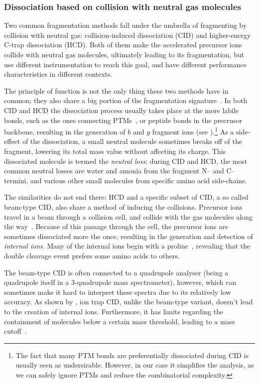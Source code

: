 \subsubsection{Dissociation based on collision with neutral gas molecules}

Two common fragmentation methods fall under the umbrella of fragmenting by collision with neutral gas: collision-induced dissociation (CID) and higher-energy C-trap dissociation (HCD). Both of them make the accelerated precursor ions collide with neutral gas molecules, ultimately leading to its fragmentation, but use different instrumentation to reach this goal, and have different performance characteristics in different contexts.

The principle of function is not the only thing these two methods have in common; they also share a big portion of the fragmentation signature~\cite{michalski2012systematic}. In both CID and HCD the dissociation process usually takes place at the more labile bonds, such as the ones connecting PTMs~\cite{quan2013cid}, or peptide bonds in the precrusor backbone, resulting in the generation of \(b\) and \(y\) fragment ions (see ).\footnote{The fact that many PTM bonds are preferentially dissociated during CID is usually seen as undersirable. However, in our case it simplifies the analysis, as we can safely ignore PTMs and reduce the combinatorial complexity.} As a side-effect of the dissociation, a small neutral molecule sometimes breaks off of the fragment, lowering its total mass value without affecting its charge. This dissociated molecule is termed the \emph{neutral loss}; during CID and HCD, the most common neutral losses are water and amonia from the fragment N-- and C-- termini, and various other small molecules from specific amino acid side-chains.

The similarities do not end there: HCD and a specific subset of CID, a so called beam-type CID, also share a method of inducing the collisions. Precursor ions travel in a beam through a collision cell, and collide with the gas molecules along the way~\cite{xia2006ion}. Because of this passage through the cell, the precursor ions are sometimes dissociated more the once, resulting in the generation and detection of \emph{internal ions}. Many of the internal ions begin with a proline~\cite{michalski2012systematic}, revealing that the double cleavage event prefers some amino acids to others.

The beam-type CID is often connected to a quadrupole analyser (being a quadrupole itself in a 3-quadrupole mass spectrometer), however, which can sometimes make it hard to interpret these spectra due to its relatively low accuracy. As shown by \citet{michalski2012systematic}, ion trap CID, unlike the beam-type variant, doesn't lead to the creation of internal ions. Furthermore, it has limits regarding the containment of molecules below a certain mass threshold, leading to a mass cutoff~\cite{louris1987instrumentation}.

